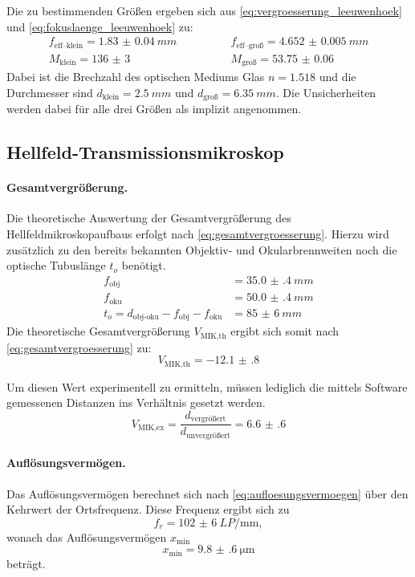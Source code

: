\documentclass[english, ngerman]{scrartcl}
\begin{document}
Die zu bestimmenden Größen ergeben sich aus \autoref{eq:vergroesserung_leeuwenhoek} und \autoref{eq:fokuslaenge_leeuwenhoek} zu:
%
\begin{align*}
    f_{\text{eff--klein}} = \SI{1.83(4)}{mm} \qquad & \qquad f_{\text{eff--groß}} = \SI{4.652(5)}{mm} \\
    M_\text{klein} = \num{136(3)} \qquad            & \qquad M_\text{groß} = \num{53.75(6)}
\end{align*}
%
Dabei ist die Brechzahl des optischen Mediums Glas $n = \num{1.518}$ und die Durchmesser sind $d_\text{klein} = \SI{2.5}{mm}$ und $d_\text{groß} = \SI{6.35}{mm}$. Die Unsicherheiten werden dabei für alle drei Größen als implizit angenommen.


\subsection{Hellfeld-Transmissionsmikroskop}
\label{subsec:auswertung_hellfeld}

\paragraph{Gesamtvergrößerung.}
Die theoretische Auswertung der Gesamtvergrößerung des Hellfeldmikroskopaufbaus erfolgt nach \autoref{eq:gesamtvergroesserung}. Hierzu wird zusätzlich zu den bereits bekannten Objektiv- und Okularbrennweiten noch die optische Tubuslänge $t_o$ benötigt.
\begin{align*}
    f_\text{obj}                                   & = \SI{35.0(4)}{mm} \\
    f_\text{oku}                                   & = \SI{50.0(4)}{mm} \\
    t_o=d_\text{obj-oku}-f_\text{obj}-f_\text{oku} & = \SI{85(6)}{mm}
\end{align*}
%
Die theoretische Gesamtvergrößerung $V_\text{MIK,th}$ ergibt sich somit nach \autoref{eq:gesamtvergroesserung} zu:
\[V_\text{MIK,th} = \num{-12.1(8)}\]

Um diesen Wert experimentell zu ermitteln, müssen lediglich die mittels Software gemessenen Distanzen ins Verhältnis gesetzt werden.
\[V_\text{MIK,ex}=\frac{d_\text{vergrößert}}{d_\text{unvergrößert}}=\num{6.6(6)}\]

\paragraph{Auflösungsvermögen.}
Das Auflösungsvermögen berechnet sich nach \autoref{eq:aufloesungsvermoegen} über den Kehrwert der Ortsfrequenz. Diese Frequenz ergibt sich zu
\[f_r = \SI{102(6)}{LP\per\milli\meter},\]
wonach das Auflösungsvermögen $x_\text{min}$
\[x_\text{min} = \SI{9.8(6)}{\micro\meter}\]
beträgt.
\end{document}
